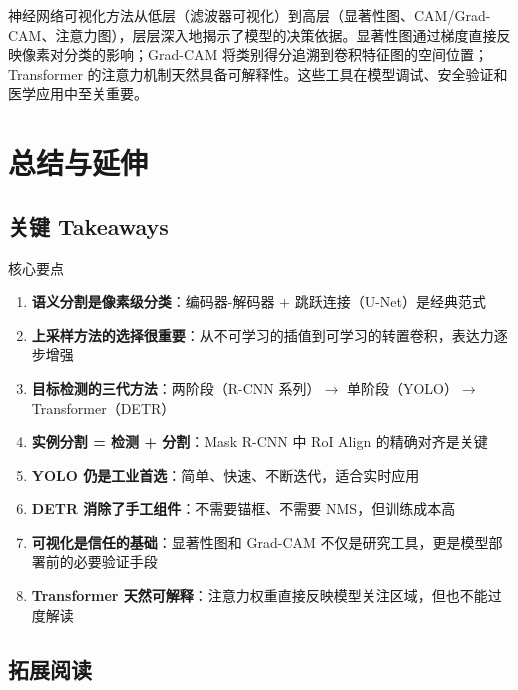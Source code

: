 \documentclass[a4paper]{article}
\begin{document}
神经网络可视化方法从低层（滤波器可视化）到高层（显著性图、CAM/Grad-CAM、注意力图），层层深入地揭示了模型的决策依据。显著性图通过梯度直接反映像素对分类的影响；Grad-CAM 将类别得分追溯到卷积特征图的空间位置；Transformer 的注意力机制天然具备可解释性。这些工具在模型调试、安全验证和医学应用中至关重要。


\section{总结与延伸}

\subsection{关键 Takeaways}

\begin{importantbox}{核心要点}
\begin{enumerate}
    \item \textbf{语义分割是像素级分类}：编码器-解码器 + 跳跃连接（U-Net）是经典范式
    \item \textbf{上采样方法的选择很重要}：从不可学习的插值到可学习的转置卷积，表达力逐步增强
    \item \textbf{目标检测的三代方法}：两阶段（R-CNN 系列）$\rightarrow$ 单阶段（YOLO）$\rightarrow$ Transformer（DETR）
    \item \textbf{实例分割 = 检测 + 分割}：Mask R-CNN 中 RoI Align 的精确对齐是关键
    \item \textbf{YOLO 仍是工业首选}：简单、快速、不断迭代，适合实时应用
    \item \textbf{DETR 消除了手工组件}：不需要锚框、不需要 NMS，但训练成本高
    \item \textbf{可视化是信任的基础}：显著性图和 Grad-CAM 不仅是研究工具，更是模型部署前的必要验证手段
    \item \textbf{Transformer 天然可解释}：注意力权重直接反映模型关注区域，但也不能过度解读
\end{enumerate}
\end{importantbox}

\subsection{拓展阅读}
\end{document}
